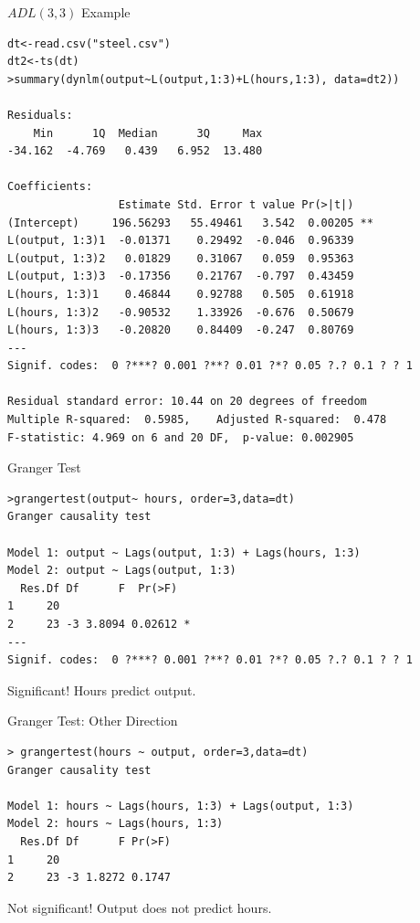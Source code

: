 \begin{frame}[fragile]{$ADL(3,3)$ Example}
\tiny
\begin{verbatim}
dt<-read.csv("steel.csv")
dt2<-ts(dt)
>summary(dynlm(output~L(output,1:3)+L(hours,1:3), data=dt2))

Residuals:
    Min      1Q  Median      3Q     Max 
-34.162  -4.769   0.439   6.952  13.480 

Coefficients:
                 Estimate Std. Error t value Pr(>|t|)   
(Intercept)     196.56293   55.49461   3.542  0.00205 **
L(output, 1:3)1  -0.01371    0.29492  -0.046  0.96339   
L(output, 1:3)2   0.01829    0.31067   0.059  0.95363   
L(output, 1:3)3  -0.17356    0.21767  -0.797  0.43459   
L(hours, 1:3)1    0.46844    0.92788   0.505  0.61918   
L(hours, 1:3)2   -0.90532    1.33926  -0.676  0.50679   
L(hours, 1:3)3   -0.20820    0.84409  -0.247  0.80769   
---
Signif. codes:  0 ?***? 0.001 ?**? 0.01 ?*? 0.05 ?.? 0.1 ? ? 1

Residual standard error: 10.44 on 20 degrees of freedom
Multiple R-squared:  0.5985,	Adjusted R-squared:  0.478 
F-statistic: 4.969 on 6 and 20 DF,  p-value: 0.002905
\end{verbatim}

\end{frame}


\begin{frame}[fragile]{Granger Test}
\begin{verbatim}
>grangertest(output~ hours, order=3,data=dt)
Granger causality test

Model 1: output ~ Lags(output, 1:3) + Lags(hours, 1:3)
Model 2: output ~ Lags(output, 1:3)
  Res.Df Df      F  Pr(>F)  
1     20                    
2     23 -3 3.8094 0.02612 *
---
Signif. codes:  0 ?***? 0.001 ?**? 0.01 ?*? 0.05 ?.? 0.1 ? ? 1
\end{verbatim}
Significant! Hours predict output.
\end{frame}

\begin{frame}[fragile]{Granger Test: Other Direction}
\begin{verbatim}
> grangertest(hours ~ output, order=3,data=dt)
Granger causality test

Model 1: hours ~ Lags(hours, 1:3) + Lags(output, 1:3)
Model 2: hours ~ Lags(hours, 1:3)
  Res.Df Df      F Pr(>F)
1     20                 
2     23 -3 1.8272 0.1747
\end{verbatim}
Not significant! Output does not predict hours.
\end{frame}

